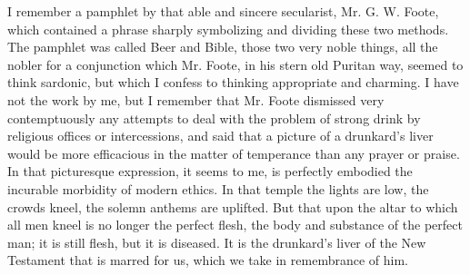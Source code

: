 I remember a pamphlet by that able and sincere secularist, Mr. G. W. Foote, which contained a phrase sharply symbolizing and dividing these two methods. The pamphlet was called Beer and Bible, those two very noble things, all the nobler for a conjunction which Mr. Foote, in his stern old Puritan way, seemed to think sardonic, but which I confess to thinking appropriate and charming. I have not the work by me, but I remember that Mr. Foote dismissed very contemptuously any attempts to deal with the problem of strong drink by religious offices or intercessions, and said that a picture of a drunkard’s liver would be more efficacious in the matter of temperance than any prayer or praise. In that picturesque expression, it seems to me, is perfectly embodied the incurable morbidity of modern ethics. In that temple the lights are low, the crowds kneel, the solemn anthems are uplifted. But that upon the altar to which all men kneel is no longer the perfect flesh, the body and substance of the perfect man; it is still flesh, but it is diseased. It is the drunkard’s liver of the New Testament that is marred for us, which we take in remembrance of him.


